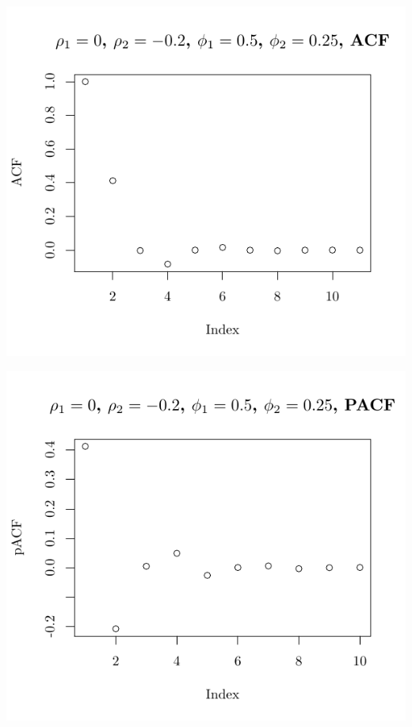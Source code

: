 \documentclass[10pt]{paper}\usepackage[]{graphicx}\usepackage[]{color}
\makeatletter
\def\maxwidth{ %
  \ifdim\Gin@nat@width>\linewidth
    \linewidth
  \else
    \Gin@nat@width
  \fi
}
\newenvironment{knitrout}{}{} %
\makeatother
\begin{document}
\begin{knitrout}
{\centering \includegraphics[width=\maxwidth]{figure/graphics-plotter-71} 

}




{\centering \includegraphics[width=\maxwidth]{figure/graphics-plotter-72} 

}





\end{knitrout}
\end{document}
